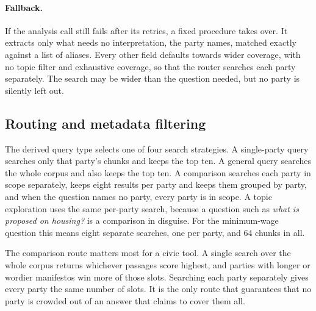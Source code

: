 \paragraph{Fallback.} If the analysis call still fails after its retries, a
fixed procedure takes over. It extracts only what needs no interpretation, the
party names, matched exactly against a list of aliases. Every other field
defaults towards wider coverage, with no topic filter and exhaustive coverage,
so that the router searches each party separately. The search may be wider
than the question needed, but no party is silently left out.

\subsection{Routing and metadata filtering} \label{subsec:routing}

The derived query type selects one of four search strategies. A single-party
query searches only that party's chunks and keeps the top ten. A general query
searches the whole corpus and also keeps the top ten. A comparison searches
each party in scope separately, keeps eight results per party and keeps them
grouped by party, and when the question names no party, every party is in
scope. A topic exploration uses the same per-party search, because a question
such as \textit{what is proposed on housing?} is a comparison in disguise. For
the minimum-wage question this means eight separate searches, one per party,
and 64 chunks in all.

The comparison route matters most for a civic tool. A single search over the
whole corpus returns whichever passages score highest, and parties with longer
or wordier manifestos win more of those slots. Searching each party separately
gives every party the same number of slots. It is the only route that
guarantees that no party is crowded out of an answer that claims to cover them
all.

